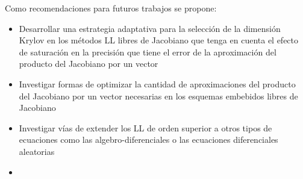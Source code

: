 \begin{recomendations}

Como recomendaciones para futuros trabajos se propone:
\begin{itemize}
	\item Desarrollar una estrategia adaptativa para la selección de la dimensión Krylov en los métodos LL libres de Jacobiano que tenga en cuenta el efecto de saturación en la precisión que tiene el error de la aproximación del producto del Jacobiano por un vector
	\item Investigar formas de optimizar la cantidad de aproximaciones del producto del Jacobiano por un vector necesarias en los esquemas embebidos libres de Jacobiano
	\item Investigar vías de extender los LL de orden superior a otros tipos de ecuaciones como las algebro-diferenciales o las ecuaciones diferenciales aleatorias
	\item {}
\end{itemize}

\end{recomendations}
